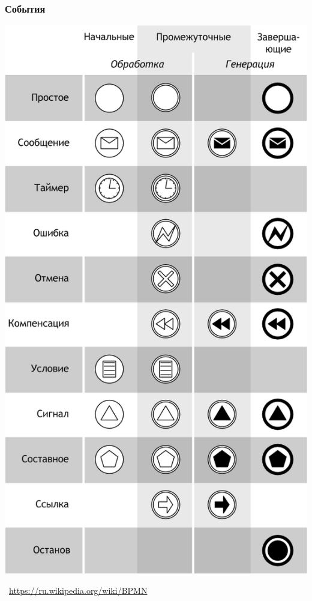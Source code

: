 \documentclass[xetex,mathserif,serif]{beamer}
\newcommand{\attribution}[1] {
	\vspace{-5mm}\begin{flushright}\begin{scriptsize}\textcolor{gray}{\textcopyright\, #1}\end{scriptsize}\end{flushright}
}
\begin{document}
	\begin{frame}
		\frametitle{События}
		\begin{center}
			\includegraphics[height=0.8\textheight]{bpmnEvents.png}
			\attribution{\url{https://ru.wikipedia.org/wiki/BPMN}}
		\end{center}
	\end{frame}
\end{document}
